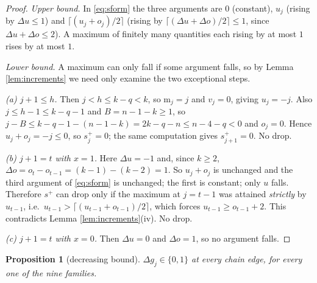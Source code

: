 \documentclass[reqno]{amsart}
\theoremstyle{plain}
\newtheorem{proposition}[theorem]{Proposition}
\theoremstyle{definition}
\newcommand{\ms}{\mathrm{m}}
\begin{document}
\begin{proof}
\emph{Upper bound.}  In \eqref{eq:sform} the three arguments are $0$ (constant),
$u_j$ (rising by $\Delta u\le1$) and $\lceil(u_j+o_j)/2\rceil$ (rising by
$\lceil(\Delta u+\Delta o)/2\rceil\le1$, since $\Delta u+\Delta o\le2$).  A
maximum of finitely many quantities each rising by at most $1$ rises by at most
$1$.

\emph{Lower bound.}  A maximum can only fall if some argument falls, so by
Lemma \ref{lem:increments} we need only examine the two exceptional steps.

\emph{(a) $j+1\le h$.}  Then $j<h\le k-q<k$, so $\ms_j=j$ and $v_j=0$, giving
$u_j=-j$.  Also $j\le h-1\le k-q-1$ and $B=n-1-k\ge1$, so
$j-B\le k-q-1-(n-1-k)=2k-q-n\le n-4-q<0$ and $o_j=0$.  Hence
$u_j+o_j=-j\le0$, so $s^{+}_j=0$; the same computation gives $s^{+}_{j+1}=0$.
No drop.

\emph{(b) $j+1=t$ with $x=1$.}  Here $\Delta u=-1$ and, since $k\ge2$,
$\Delta o=o_t-o_{t-1}=(k-1)-(k-2)=1$.  So $u_j+o_j$ is unchanged and the third
argument of \eqref{eq:sform} is unchanged; the first is constant; only $u$
falls.  Therefore $s^{+}$ can drop only if the maximum at $j=t-1$ was attained
\emph{strictly} by $u_{t-1}$, i.e.\
$u_{t-1}>\lceil(u_{t-1}+o_{t-1})/2\rceil$, which forces $u_{t-1}\ge o_{t-1}+2$.
This contradicts Lemma \ref{lem:increments}(iv).  No drop.

\emph{(c) $j+1=t$ with $x=0$.}  Then $\Delta u=0$ and $\Delta o=1$, so no
argument falls.
\end{proof}

\begin{proposition}[decreasing bound]\label{prop:decr}
$\Delta g_j\in\{0,1\}$ at every chain edge, for every one of the nine families.
\end{proposition}
\end{document}
